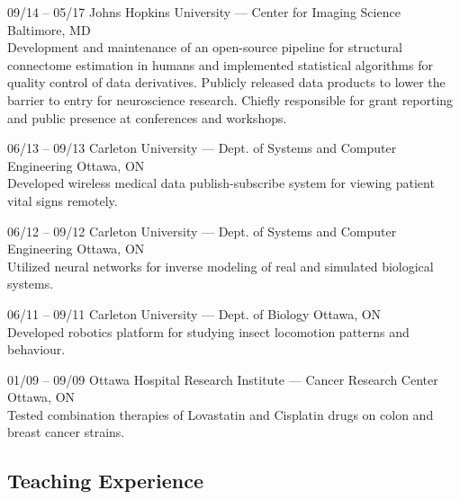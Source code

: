 \documentclass[]{friggeri-cv} %
\begin{document}
%

\begin{entrylist}

\entry
{09/14 -- 05/17}
{Johns Hopkins University — Center for Imaging Science}
{Baltimore, MD}
{\\
Development and maintenance of an open-source pipeline for structural connectome estimation in humans
and implemented statistical algorithms for quality control of data derivatives. Publicly released data
products to lower the barrier to entry for neuroscience research. Chiefly responsible for grant reporting
and public presence at conferences and workshops.}

\entry
{06/13 -- 09/13}
{Carleton University — Dept. of Systems and Computer Engineering}
{Ottawa, ON}
{\\
Developed wireless medical data publish-subscribe system for viewing patient vital signs remotely.}

\entry
{06/12 -- 09/12}
{Carleton University — Dept. of Systems and Computer Engineering}
{Ottawa, ON}
{\\
Utilized neural networks for inverse modeling of real and simulated biological systems.}

\entry
{06/11 -- 09/11}
{Carleton University — Dept. of Biology}
{Ottawa, ON}
{\\
Developed robotics platform for studying insect locomotion patterns and behaviour.}

\entry
{01/09 -- 09/09}
{Ottawa Hospital Research Institute — Cancer Research Center}
{Ottawa, ON}
{\\
Tested combination therapies of Lovastatin and Cisplatin drugs on colon and breast cancer strains.}
\end{entrylist}

\subsection{Teaching Experience}
\end{document}
